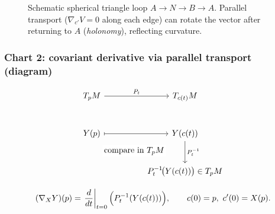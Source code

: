 \documentclass[12pt,a4paper]{article}
\theoremstyle{plain}
\theoremstyle{definition}      %
\begin{document}
\begin{figure}[H]
		\caption{Schematic spherical triangle loop $A\to N\to B\to A$.
			Parallel transport ($\nabla_{c'}V=0$ along each edge) can rotate the vector after returning to $A$
			(\emph{holonomy}), reflecting curvature.}
	\end{figure}
	
	\subsubsection*{Chart 2: covariant derivative via parallel transport (diagram)}
	
\[
\begin{tikzcd}[column sep=huge, row sep=large]
	T_pM \arrow[r,"P_t"] & T_{c(t)}M \\
	Y(p)\arrow[r,mapsto] \arrow[dr, phantom, "\text{compare in }T_pM" description] &
	Y(c(t)) \arrow[d,"P_t^{-1}"] \\
	& P_t^{-1}\!\bigl(Y(c(t))\bigr)\in T_pM
\end{tikzcd}
\]

	\[
	(\nabla_XY)(p)=\left.\frac{d}{dt}\right|_{t=0}\Bigl(P_t^{-1}(Y(c(t)))\Bigr),
	\qquad c(0)=p,\ c'(0)=X(p).
	\]
	
	
	
\end{document}
